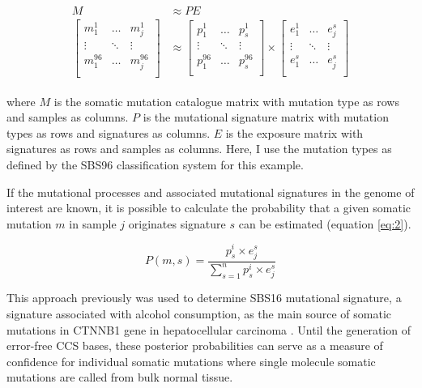 \begin{align}
\begin{split} 
M &\approx PE \label{eq:1} \\
\begin{bmatrix}
    m^{1}_{1} & \dots & m^{1}_{j} \\
    \vdots & \ddots & \vdots \\
    m^{96}_{1} & \dots & m^{96}_{j} \\
\end{bmatrix} &\approx
\begin{bmatrix}
    p^{1}_{1} & \dots & p^{1}_{s} \\
    \vdots & \ddots & \vdots \\
    p^{96}_{1} & \dots & p^{96}_{s} \\
\end{bmatrix} \times
\begin{bmatrix}
    e^{1}_{1} & \dots & e^{s}_{j} \\
    \vdots & \ddots & \vdots \\
    e^{s}_{1} & \dots & e^{s}_{j} \\
\end{bmatrix} 
\end{split}
\end{align}

where $M$ is the somatic mutation catalogue matrix with mutation type as rows and samples as columns. $P$ is the mutational signature matrix with mutation types as rows and signatures as columns. $E$ is the exposure matrix with signatures as rows and samples as columns. Here, I use the mutation types as defined by the SBS96 classification system for this example.

If the mutational processes and associated mutational signatures in the genome of interest are known, it is possible to calculate the probability that a given somatic mutation $m$ in sample $j$ originates signature $s$ can be estimated (equation \ref{eq:2}). 

\begin{equation} \label{eq:2} 
P(m,s) = \frac{p^{i}_{s} \times e^{s}_{j}}{\sum^{n}_{s=1}p^{i}_{s} \times e^{s}_{j}}
\end{equation}

This approach previously was used to determine SBS16 mutational signature, a signature associated with alcohol consumption, as the main source of somatic mutations in CTNNB1 gene in hepatocellular carcinoma \cite{Letouze2017-tl}. Until the generation of error-free CCS bases, these posterior probabilities can serve as a measure of confidence for individual somatic mutations where single molecule somatic mutations are called from bulk normal tissue. 

